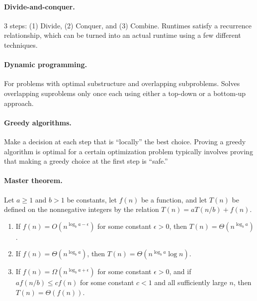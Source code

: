 \documentclass[11  pt]{exam}
\begin{document}
    \paragraph{Divide-and-conquer.} 3 steps: (1) Divide, (2) Conquer, and (3) Combine. Runtimes satisfy a recurrence relationship, which can be turned into an actual runtime using a few different techniques.
    
    \paragraph{Dynamic programming.} For problems with optimal substructure and overlapping subproblems. Solves overlapping suproblems only once each using either a top-down or a bottom-up approach.
    \paragraph{Greedy algorithms.} Make a decision at each step that is ``locally'' the best choice. Proving a greedy algorithm is optimal for a certain optimization problem typically involves proving that making a greedy choice at the first step is ``safe.''
    
    \paragraph{Master theorem.}
    Let $a \geq 1$ and $b > 1$ be constants, let $f(n)$ be a function, and let $T(n)$ be defined on the nonnegative integers by the relation $T(n) = aT(n/b) + f(n)$.
    \begin{enumerate}
        \item If $f(n) = O(n^{\log_b a - \epsilon})$ for some constant $\epsilon > 0$, then $T(n) = \Theta (n^{\log_b a })$.
        \item If $f(n) = \Theta(n^{\log_b a})$, then $T(n) = \Theta (n^{\log_b a } \log n)$.
        \item If $f(n) = \Omega(n^{\log_b a + \epsilon})$ for some constant $\epsilon > 0$, and if $a f(n/b) \leq c f(n)$ for some constant $c < 1$ and all sufficiently large $n$, then $T(n) = \Theta (f(n))$.
    \end{enumerate}
\end{document}
